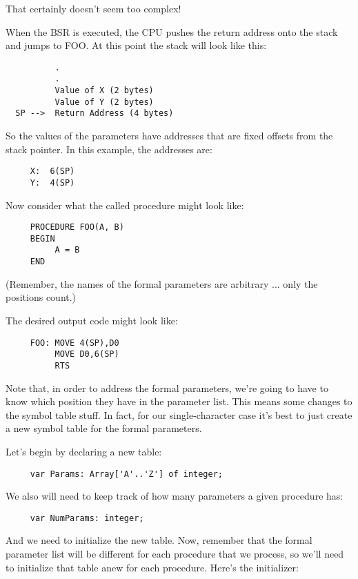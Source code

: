 That certainly doesn't seem too complex!

When the BSR is executed, the CPU pushes the return  address onto the stack and jumps to FOO. At  this point the stack will look like this:

\begin{verbatim}
          .
          .
          Value of X (2 bytes)
          Value of Y (2 bytes)
  SP -->  Return Address (4 bytes)
\end{verbatim}

So the values of  the  parameters  have  addresses that are fixed offsets from the stack pointer. In this  example, the addresses are:

\begin{verbatim}
     X:  6(SP)
     Y:  4(SP)
\end{verbatim}

Now consider what the called procedure might look like:

\begin{verbatim}
     PROCEDURE FOO(A, B)
     BEGIN
          A = B
     END
\end{verbatim}

(Remember, the names  of  the formal parameters are arbitrary ... only the positions count.)

The desired output code might look like:

\begin{verbatim}
     FOO: MOVE 4(SP),D0
          MOVE D0,6(SP)
          RTS
\end{verbatim}

Note that, in order to address the formal parameters, we're going to have to know  which  position they have in the parameter list. This means some changes to the symbol table stuff. In  fact, for our single-character case it's best to just create  a  new symbol table for the formal parameters.

Let's begin by declaring a new table:

\begin{verbatim}
     var Params: Array['A'..'Z'] of integer;
\end{verbatim}

We  also  will  need to keep track of how many parameters a given procedure has:

\begin{verbatim}
     var NumParams: integer;
\end{verbatim}

And we need to initialize the new table. Now, remember  that the formal parameter list  will  be different for each procedure that we process, so we'll need to initialize that table anew  for each procedure. Here's the initializer:

